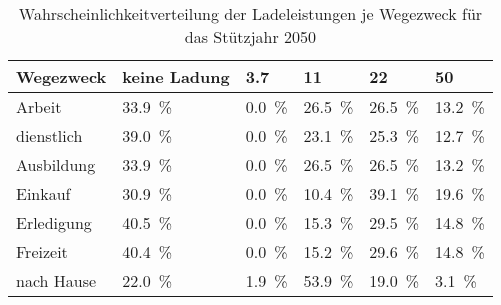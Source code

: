 {
\renewcommand{\arraystretch}{1.2}%
\begin{table}[H]
	\begin{center}
		\caption{Wahrscheinlichkeitverteilung der Ladeleistungen je Wegezweck für das Stützjahr \num{2050}}
		\begin{tabu} to \textwidth {X[1.2] X[1.2, r] X[1, r] X[1, r] X[1, r] X[1, r]}
			\hline
			Wegezweck  & keine Ladung        & \SI{3.7}{\kw}      & \SI{11}{\kw}        & \SI{22}{\kw}        & \SI{50}{\kw}        \\ \hline
			Arbeit     & \SI{33.9}{\percent} & \SI{0.0}{\percent} & \SI{26.5}{\percent} & \SI{26.5}{\percent} & \SI{13.2}{\percent} \\
			dienstlich & \SI{39.0}{\percent} & \SI{0.0}{\percent} & \SI{23.1}{\percent} & \SI{25.3}{\percent} & \SI{12.7}{\percent} \\
			Ausbildung & \SI{33.9}{\percent} & \SI{0.0}{\percent} & \SI{26.5}{\percent} & \SI{26.5}{\percent} & \SI{13.2}{\percent} \\
			Einkauf    & \SI{30.9}{\percent} & \SI{0.0}{\percent} & \SI{10.4}{\percent} & \SI{39.1}{\percent} & \SI{19.6}{\percent} \\
			Erledigung & \SI{40.5}{\percent} & \SI{0.0}{\percent} & \SI{15.3}{\percent} & \SI{29.5}{\percent} & \SI{14.8}{\percent} \\
			Freizeit   & \SI{40.4}{\percent} & \SI{0.0}{\percent} & \SI{15.2}{\percent} & \SI{29.6}{\percent} & \SI{14.8}{\percent} \\
			nach Hause & \SI{22.0}{\percent} & \SI{1.9}{\percent} & \SI{53.9}{\percent} & \SI{19.0}{\percent} & \SI{3.1}{\percent}  \\ \hline
		\end{tabu}
		\label{tab:WegezweckProbability2050}
	\end{center}
	\vspace{-3mm}%
\end{table}
}